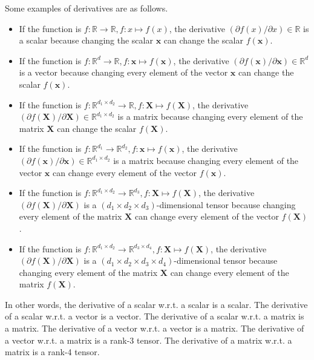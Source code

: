 \documentclass[lang=cn,10pt]{gorgeousnbook}
\numberwithin{equation}{section}%
\numberwithin{figure}{section}%
\begin{document}
\begin{remark}
Some examples of derivatives are as follows. 
\begin{itemize}\setlength\itemsep{0.01em}
\item If the function is $f: \mathbb{R} \rightarrow \mathbb{R}, f: x \mapsto f(x)$, the derivative $(\partial f(x) / \partial x) \in \mathbb{R}$ is a scalar because changing the scalar $\boldsymbol{x}$ can change the scalar $f(\boldsymbol{x})$.
\item If the function is $f: \mathbb{R}^{d} \rightarrow \mathbb{R}, f: \boldsymbol{x} \mapsto f(\boldsymbol{x})$, the derivative $(\partial f(\boldsymbol{x}) / \partial \boldsymbol{x}) \in \mathbb{R}^d$ is a vector because changing every element of the vector $\boldsymbol{x}$ can change the scalar $f(\boldsymbol{x})$.
\item If the function is $f: \mathbb{R}^{d_1 \times d_2} \rightarrow \mathbb{R}, f: \boldsymbol{X} \mapsto f(\boldsymbol{X})$, the derivative $(\partial f(\boldsymbol{X}) / \partial \boldsymbol{X}) \in \mathbb{R}^{d_1 \times d_2}$ is a matrix because changing every element of the matrix $\boldsymbol{X}$ can change the scalar $f(\boldsymbol{X})$.
\item If the function is $f: \mathbb{R}^{d_1} \rightarrow \mathbb{R}^{d_2}, f: \boldsymbol{x} \mapsto f(\boldsymbol{x})$, the derivative $(\partial f(\boldsymbol{x}) / \partial \boldsymbol{x}) \in \mathbb{R}^{d_1 \times d_2}$ is a matrix because changing every element of the vector $\boldsymbol{x}$ can change every element of the vector $f(\boldsymbol{x})$.
\item If the function is $f: \mathbb{R}^{d_1 \times d_2} \rightarrow \mathbb{R}^{d_3}, f: \boldsymbol{X} \mapsto f(\boldsymbol{X})$, the derivative $(\partial f(\boldsymbol{X}) / \partial \boldsymbol{X})$ is a $(d_1 \times d_2 \times d_3)$-dimensional tensor because changing every element of the matrix $\boldsymbol{X}$ can change every element of the vector $f(\boldsymbol{X})$.
\item If the function is $f: \mathbb{R}^{d_1 \times d_2} \rightarrow \mathbb{R}^{d_3 \times d_4}, f: \boldsymbol{X} \mapsto f(\boldsymbol{X})$, the derivative $(\partial f(\boldsymbol{X}) / \partial \boldsymbol{X})$ is a $(d_1 \times d_2 \times d_3 \times d_4)$-dimensional tensor because changing every element of the matrix $\boldsymbol{X}$ can change every element of the matrix $f(\boldsymbol{X})$.
\end{itemize}
In other words, the derivative of a scalar w.r.t. a scalar is a scalar.
The derivative of a scalar w.r.t. a vector is a vector.
The derivative of a scalar w.r.t. a matrix is a matrix.
The derivative of a vector w.r.t. a vector is a matrix.
The derivative of a vector w.r.t. a matrix is a rank-3 tensor.
The derivative of a matrix w.r.t. a matrix is a rank-4 tensor.
\end{remark}
\end{document}
